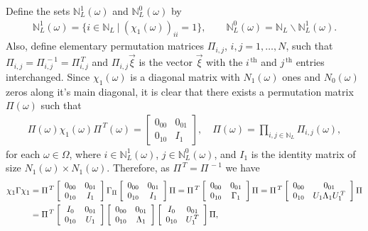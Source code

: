 \documentclass{cmslatex}
\begin{document}
Define the sets $\mathbb{N}_L^1(\omega)$ and $\mathbb{N}_L^0(\omega)$ by
%
\begin{align}\label{eq:Zero_One_indices}
  \mathbb{N}_L^1(\omega)=\{i\in\mathbb{N}_L \ | \ (\chi_1(\omega))_{ii}=1\}, \qquad
  \mathbb{N}_L^0(\omega)=\mathbb{N}_L\backslash \mathbb{N}_L^1(\omega).
\end{align}
%
Also, define elementary permutation matrices \cite{Demmel:1997} $\Pi_{i,j}$,
$i,j=1,\ldots,N$, such that $\Pi_{i,j}=\Pi_{i,j}^{\,-1}=\Pi_{i,j}^{\,T}$ and
$\Pi_{i,j}\vec{\xi}$ is the vector $\vec{\xi}$ with the $i^{\,\text{th}}$
and $j^{\,\text{th}}$ entries interchanged. Since $\chi_1(\omega)$ is a
diagonal matrix with $N_1(\omega)$ ones and $N_0(\omega)$ zeros along it's main
diagonal, it is clear that there exists a permutation matrix $\Pi(\omega)$
such that 
%
\begin{align}\label{eq:chi_Perm}
  \Pi(\omega)\chi_1(\omega)\Pi^{\,T}(\omega)=
  \left[
  \begin{array}{ccc}
    0_{00}&0_{01}\\
    0_{10}&I_1   
    \end{array}
\right],
\quad
\Pi(\omega)=\prod_{i,j\in\mathbb{N}_L}\Pi_{i,j}(\omega),
\end{align}
%
for each $\omega\in\Omega$, where $i\in\mathbb{N}_L^1(\omega)$, $j\in\mathbb{N}_L^0(\omega)$,
and $I_1$ is the identity matrix of size $N_1(\omega)\times N_1(\omega)$. Therefore,
as $\Pi^{\,T}=\Pi^{\,-1}$ we have
%
\begin{align}\label{eq:Spec_Decomp_chi_Gamma_chi_Proof}
  \chi_1\Gamma\chi_1&=
  \Pi^{\,T}
  \left[
  \begin{array}{ccc}
    0_{00}&0_{01}\\
    0_{10}&I_1   
    \end{array}
\right]
\Gamma_\Pi
\left[
  \begin{array}{ccc}
    0_{00}&0_{01}\\
    0_{10}&I_1   
    \end{array}
\right]
\Pi
=
\Pi^{\,T}
\left[
  \begin{array}{ccc}
    0_{00}&0_{01}\\
    0_{10}&\Gamma_1   
    \end{array}
\right]
\Pi
=
\Pi^{\,T}
\left[
  \begin{array}{ccc}
    0_{00}&0_{01}\\
    0_{10}&U_1\Lambda_1U_1^{\,T} 
    \end{array}
\right]
\Pi
\notag\\
&=
\Pi^{\,T}
\left[
  \begin{array}{ccc}
    I_0&0_{01}\\
    0_{10}&U_1 
    \end{array}
\right]    
\left[
  \begin{array}{ccc}
    0_{00}&0_{01}\\
    0_{10}&\Lambda_1
    \end{array}
\right]    
\left[
  \begin{array}{ccc}
    I_0&0_{01}\\
    0_{10}&U_1^{\,T} 
    \end{array}
\right]    
\Pi,
\end{align}
\end{document}
